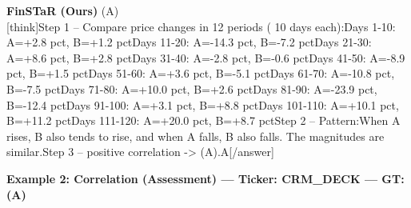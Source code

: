 \begin{minipage}[t]{0.41\textwidth}
\colorbox{green!10}{\parbox{\dimexpr\textwidth-2\fboxsep}{
\textbf{FinSTaR (Ours)} \textcolor{green!50!black}{(A)} \\[2pt]
\tiny
[think]\newline Step 1 -- Compare price changes in 12 periods ( 10 days each):\newline   Days 1-10: A=+2.8 pct, B=+1.2 pct\newline   Days 11-20: A=-14.3 pct, B=-7.2 pct\newline   Days 21-30: A=+8.6 pct, B=+2.8 pct\newline   Days 31-40: A=-2.8 pct, B=-0.6 pct\newline   Days 41-50: A=-8.9 pct, B=+1.5 pct\newline   Days 51-60: A=+3.6 pct, B=-5.1 pct\newline   Days 61-70: A=-10.8 pct, B=-7.5 pct\newline   Days 71-80: A=+10.0 pct, B=+2.6 pct\newline   Days 81-90: A=-23.9 pct, B=-12.4 pct\newline   Days 91-100: A=+3.1 pct, B=+8.8 pct\newline   Days 101-110: A=+10.1 pct, B=+11.2 pct\newline   Days 111-120: A=+20.0 pct, B=+8.7 pct\newline Step 2 -- Pattern:\newline When A rises, B also tends to rise, and when A falls, B also falls. The magnitudes are similar.\newline Step 3 -- positive correlation -> (A).\newline [/think]\newline [answer]A[/answer]
}}
\end{minipage}
\vspace{8pt}


\noindent
\textbf{Example 2: Correlation (Assessment) --- Ticker: CRM\_DECK --- GT: (A)}
\vspace{2pt}

